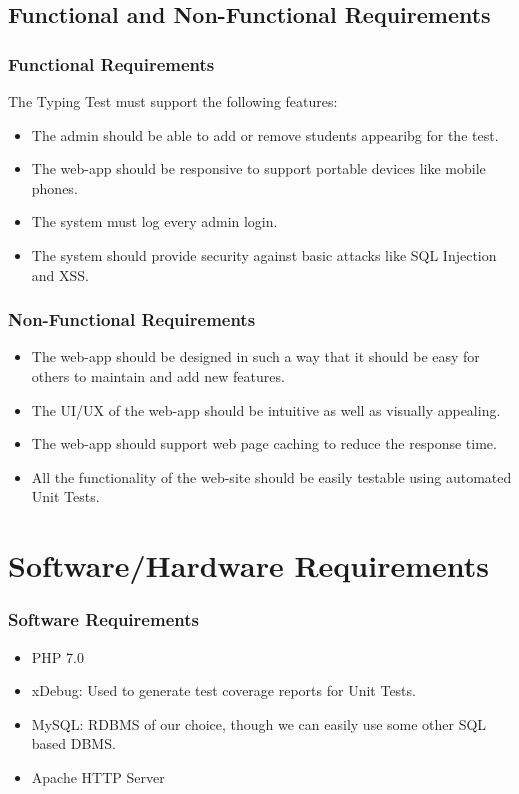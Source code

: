 \documentclass{mnnit}
\begin{document}
\section{Functional and Non-Functional Requirements}
\subsection{Functional Requirements}
The Typing Test must support the following features:
\begin{itemize}
    \item The admin should be able to add or remove students appearibg for the test.
    \item The web-app should be responsive to support portable devices like mobile phones.
    \item The system must log every admin login.
    \item The system should provide security against basic attacks like SQL Injection and XSS.
\end{itemize}
\subsection{Non-Functional Requirements}
\begin{itemize}
    \item The web-app should be designed in such a way that it should be easy for others to maintain and add new features.
    \item The UI/UX of the web-app should be intuitive as well as visually appealing.
    \item The web-app should support web page caching to reduce the response time.
    \item All the functionality of the web-site should be easily testable using automated Unit Tests.
\end{itemize}
\chapter{Software/Hardware Requirements}
\subsection{Software Requirements}
\begin{itemize}
    \item PHP 7.0
    \item xDebug: Used to generate test coverage reports for Unit Tests.
    \item MySQL: RDBMS of our choice, though we can easily use some other SQL based DBMS.
    \item Apache HTTP Server
\end{itemize}
\end{document}

